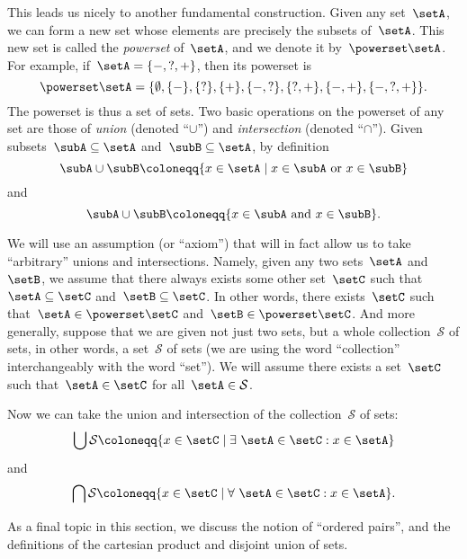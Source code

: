 This leads us nicely to another fundamental construction.
Given any set~$\setA$, we can form a new set whose elements are precisely the subsets of~$\setA$.
This new set is called the \emph{powerset} of~$\setA$, and we denote it by~$\powerset \setA$.
For example, if~$\setA = \{ -, ?, + \}$, then its powerset is
\begin{equation*}
\powerset \setA = \{ \emptyset, \{ - \}, \{ ? \}, \{ + \}, \{ -, ? \}, \{ ?, + \}, \{ -, +\}, \{ -, ?, + \} \}.
\end{equation*}
The powerset is thus a set of sets.
Two basic operations on the powerset of any set are those of \emph{union} (denoted ``$\cup$'') and \emph{intersection} (denoted ``$\cap$'').
Given subsets~$\subA \subseteq \setA$ and~$\subB \subseteq \setA$, by definition
\begin{equation*}
\subA \cup \subB \coloneqq \{ x \in \setA \mid x \in \subA \text{ or } x \in \subB \}
\end{equation*}
and
\begin{equation*}
\subA \cup \subB \coloneqq \{ x \in \subA \text{ and } x \in \subB \}.
\end{equation*}


We will use an assumption (or ``axiom'') that will in fact allow us to take ``arbitrary'' unions and intersections.
Namely, given any two sets~$\setA$ and~$\setB$, we assume that there always exists some other set~$\setC$ such that~$\setA \subseteq \setC$ and~$\setB \subseteq \setC$.
In other words, there exists~$\setC$ such that~$\setA \in \powerset \setC$ and~$\setB \in \powerset \setC$.
And more generally, suppose that we are given not just two sets, but a whole collection~$\mathcal{S}$ of sets, in other words, a set~$\mathcal{S}$ of sets (we are using the word ``collection'' interchangeably with the word ``set'').
We will assume there exists a set~$\setC$ such that~$\setA \in \setC$ for all~$\setA \in \mathcal{S}$.

Now we can take the union and intersection of the collection~$\mathcal{S}$ of sets:
\begin{equation*}
\bigcup \mathcal{S} \coloneqq \{ x \in \setC \mid \exists \  \setA \in \setC : x \in \setA \}
\end{equation*}
and
\begin{equation*}
\bigcap \mathcal{S} \coloneqq \{ x \in \setC \mid \forall \  \setA \in \setC : x \in \setA \}.
\end{equation*}

\medskip

As a final topic in this section, we discuss the notion of ``ordered pairs'', and the definitions of the cartesian product and disjoint union of sets.

